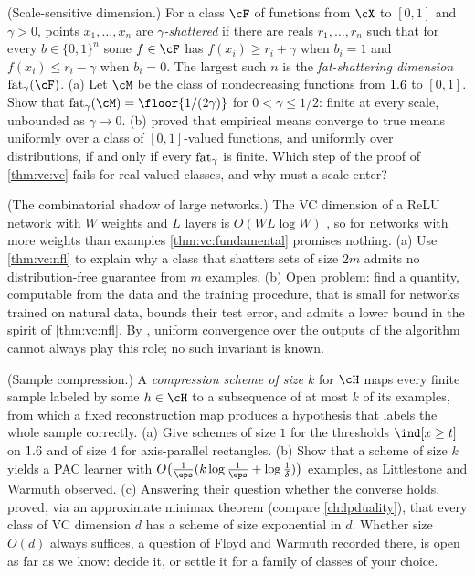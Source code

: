 \begin{refsection}
\begin{exercises}
\item \transfer\hard (Scale-sensitive dimension.) For a class $\cF$ of functions from $\cX$ to $[0,1]$ and $\gamma>0$, points $x_1,\dots,x_n$ are \emph{$\gamma$-shattered} if there are reals $r_1,\dots,r_n$ such that for every $b\in\{0,1\}^n$ some $f\in\cF$ has $f(x_i)\ge r_i+\gamma$ when $b_i = 1$ and $f(x_i)\le r_i-\gamma$ when $b_i = 0$. The largest such $n$ is the \emph{fat-shattering dimension} $\vcfat_\gamma(\cF)$. (a) Let $\cM$ be the class of nondecreasing functions from $1.6$ to $[0,1]$. Show that $\vcfat_\gamma(\cM) = \floor{1/(2\gamma)}$ for $0<\gamma\le1/2$: finite at every scale, unbounded as $\gamma\to0$. (b) \textcite{AlonEtAl1997} proved that empirical means converge to true means uniformly over a class of $[0,1]$-valued functions, and uniformly over distributions, if and only if every $\operatorname{fat}_\gamma$ is finite. Which step of the proof of \cref{thm:vc:vc} fails for real-valued classes, and why must a scale enter? \label{exr:vc:fat}


\item \research\harder (The combinatorial shadow of large networks.) The VC dimension of a ReLU network with $W$ weights and $L$ layers is $O(WL\log W)$ \parencite{BartlettEtAl2019}, so for networks with more weights than examples \cref{thm:vc:fundamental} promises nothing. (a) Use \cref{thm:vc:nfl} to explain why a class that shatters sets of size $2m$ admits no distribution-free guarantee from $m$ examples. (b) Open problem: find a quantity, computable from the data and the training procedure, that is small for networks trained on natural data, bounds their test error, and admits a lower bound in the spirit of \cref{thm:vc:nfl}. By \textcite{NagarajanKolter2019}, uniform convergence over the outputs of the algorithm cannot always play this role; no such invariant is known.\label{exr:vc:networks}

\item \research\harder (Sample compression.) A \emph{compression scheme of size $k$} for $\cH$ maps every finite sample labeled by some $h\in\cH$ to a subsequence of at most $k$ of its examples, from which a fixed reconstruction map produces a hypothesis that labels the whole sample correctly. (a) Give schemes of size $1$ for the thresholds $\ind[x\ge t]$ on $1.6$ and of size $4$ for axis-parallel rectangles. (b) Show that a scheme of size $k$ yields a PAC learner with $O\big(\frac1\eps(k\log\frac1\eps+\log\frac1\delta)\big)$ examples, as Littlestone and Warmuth observed. (c) Answering their question whether the converse holds, \textcite{MoranYehudayoff2016} proved, via an approximate minimax theorem (compare \cref{ch:lpduality}), that every class of VC dimension $d$ has a scheme of size exponential in $d$. Whether size $O(d)$ always suffices, a question of Floyd and Warmuth recorded there, is open as far as we know: decide it, or settle it for a family of classes of your choice.\label{exr:vc:compression}
\end{exercises}


\end{refsection}
